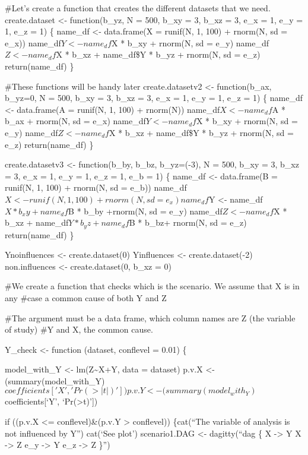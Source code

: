 \documentclass[
]{article}
\begin{document}
\#Let's create a function that creates the different datasets that we
need. create.dataset \textless- function(b\_yz, N = 500, b\_xy = 3,
b\_xz = 3, e\_x = 1, e\_y = 1, e\_z = 1) \{ name\_df \textless-
data.frame(X = runif(N, 1, 100) + rnorm(N, sd = e\_x))
name\_df\(Y <- name_df\)X * b\_xy + rnorm(N, sd = e\_y)
name\_df\(Z <- name_df\)X * b\_xz + name\_df\$Y * b\_yz + rnorm(N, sd =
e\_z) return(name\_df) \}

\#These functions will be handy later create.datasetv2 \textless-
function(b\_ax, b\_yz=0, N = 500, b\_xy = 3, b\_xz = 3, e\_x = 1, e\_y =
1, e\_z = 1) \{ name\_df \textless- data.frame(A = runif(N, 1, 100) +
rnorm(N)) name\_df\(X <- name_df\)A * b\_ax + rnorm(N, sd = e\_x)
name\_df\(Y <- name_df\)X * b\_xy + rnorm(N, sd = e\_y)
name\_df\(Z <- name_df\)X * b\_xz + name\_df\$Y * b\_yz + rnorm(N, sd =
e\_z) return(name\_df) \}

create.datasetv3 \textless- function(b\_by, b\_bz, b\_yz=(-3), N = 500,
b\_xy = 3, b\_xz = 3, e\_x = 1, e\_y = 1, e\_z = 1, e\_b = 1) \{
name\_df \textless- data.frame(B = runif(N, 1, 100) + rnorm(N, sd =
e\_b)) name\_df\(X <- runif(N, 1, 100) + rnorm(N, sd = e_x)  name_df\)Y
\textless- name\_df\(X * b_xy + name_df\)B * b\_by +rnorm(N, sd = e\_y)
name\_df\(Z <- name_df\)X * b\_xz + name\_df\(Y * b_yz +  name_df\)B *
b\_bz+ rnorm(N, sd = e\_z) return(name\_df) \}

Ynoinfluences \textless- create.dataset(0) Yinfluences \textless-
create.dataset(-2) non.influences \textless- create.dataset(0, b\_xz =
0)

\#We create a function that checks which is the scenario. We assume that
X is in any \#case a common cause of both Y and Z

\#The argument must be a data frame, which column names are Z (the
variable of study) \#Y and X, the common cause.

Y\_check \textless- function (dataset, conflevel = 0.01) \{

model\_with\_Y \textless- lm(Z\textasciitilde X+Y, data = dataset) p.v.X
\textless-(summary(model\_with\_Y)\(coefficients['X','Pr(>|t|)'])  p.v.Y <- (summary(model_with_Y)\)coefficients{[}`Y',
`Pr(\textgreater\textbar t\textbar)'{]})

if ((p.v.X \textless= conflevel)\&(p.v.Y \textgreater{} conflevel))
\{cat(``The variable of analysis is not influenced by Y\n'') cat(`See
plot\n') scenario1.DAG \textless- dagitty(``dag \{ X -\textgreater{} Y X
-\textgreater{} Z e\_y -\textgreater{} Y e\_z -\textgreater{} Z \}'')
\end{document}
